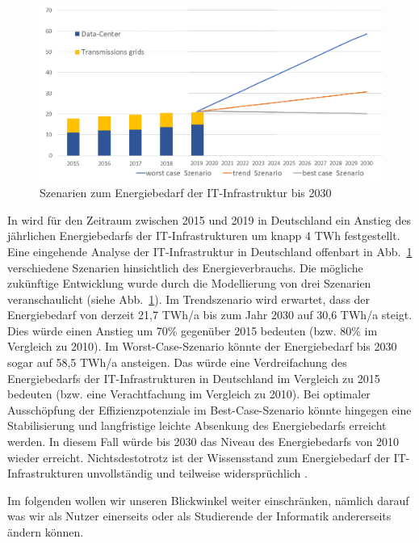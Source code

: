\documentclass{article}
\begin{document}
\begin{figure}[h]
	\centering
		\includegraphics[width=1.00\textwidth]{../Figures/fignachTAB22.png}
		\caption{Szenarien zum Energiebedarf der IT-Infrastruktur bis 2030}
	\label{fig:TAB2022_energy demand of ICT}
\end{figure}


In  \cite{grunwald_energieverbrauch_2022} wird  für den Zeitraum zwischen 2015 und 2019 in Deutschland ein Anstieg des jährlichen Energiebedarfs der IT-Infrastrukturen um knapp 4 TWh festgestellt. Eine eingehende Analyse der IT-Infrastruktur in Deutschland offenbart in Abb.~\ref{fig:TAB2022_energy demand of ICT}  verschiedene Szenarien hinsichtlich des Energieverbrauchs. 
  Die mögliche zukünftige Entwicklung wurde durch die Modellierung von drei Szenarien veranschaulicht (siehe Abb.~\ref{fig:TAB2022_energy demand of ICT}). Im Trendszenario wird erwartet, dass der Energiebedarf von derzeit 21,7 TWh/a bis zum Jahr 2030 auf 30,6 TWh/a steigt. Dies würde einen Anstieg um 70\% gegenüber 2015 bedeuten (bzw. 80\% im Vergleich zu 2010). Im Worst-Case-Szenario könnte der Energiebedarf bis 2030 sogar auf 58,5 TWh/a ansteigen. Das würde eine Verdreifachung des Energiebedarfs der IT-Infrastrukturen in Deutschland im Vergleich zu 2015 bedeuten (bzw. eine Verachtfachung im Vergleich zu 2010). Bei optimaler Ausschöpfung der Effizienzpotenziale im Best-Case-Szenario könnte hingegen eine Stabilisierung und langfristige leichte Absenkung des Energiebedarfs erreicht werden. In diesem Fall würde bis 2030 das Niveau des Energiebedarfs von 2010 wieder erreicht.
	Nichtsdestotrotz ist der Wissensstand zum Energiebedarf der IT-Infrastrukturen unvollständig und teilweise widersprüchlich \cite{grunwald_energieverbrauch_2022}.
	
	Im folgenden wollen wir unseren Blickwinkel weiter einschränken, nämlich darauf was wir als Nutzer einerseits oder als Studierende der Informatik  andererseits ändern können.
\end{document}
